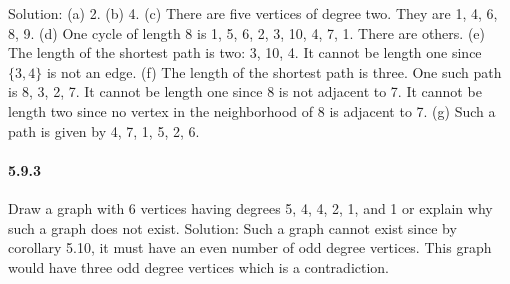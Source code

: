 \documentclass{article}
\begin{document}
Solution:\newline
(a) 2.\newline
(b) 4.\newline
(c) There are five vertices of degree two. They are 1, 4, 6, 8, 9.\newline
(d) One cycle of length 8 is 1, 5, 6, 2, 3, 10, 4, 7, 1. There are others.\newline
(e) The length of the shortest path is two: 3, 10, 4. It cannot be length one since $\{3, 4\}$ is not
an edge.\newline
(f) The length of the shortest path is three. One such path is 8, 3, 2, 7. It cannot be length\newline
one since 8 is not adjacent to 7. It cannot be length two since no vertex in the neighborhood
of 8 is adjacent to 7.\newline
(g) Such a path is given by 4, 7, 1, 5, 2, 6.
\paragraph{5.9.3}
Draw a graph with 6 vertices having degrees 5, 4, 4, 2, 1, and 1 or explain why such
a graph does not exist.\newline
Solution:\newline
Such a graph cannot exist since by corollary 5.10, it must have an even number of odd degree
vertices. This graph would have three odd degree vertices which is a contradiction.
\end{document}
